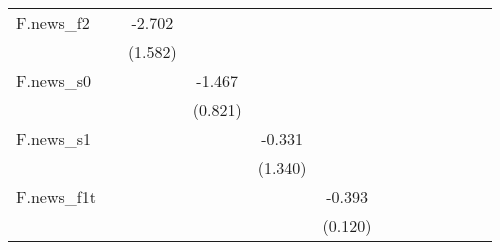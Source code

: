 {\begin{tabular}{l*{12}{c}}
\addlinespace
F.news\_f2   &                     &      -2.702\sym{*}  &                     &                     &                     &                     &                     &                     &                     &                     &                     &                     \\
            &                     &     (1.582)         &                     &                     &                     &                     &                     &                     &                     &                     &                     &                     \\
\addlinespace
F.news\_s0   &                     &                     &      -1.467\sym{*}  &                     &                     &                     &                     &                     &                     &                     &                     &                     \\
            &                     &                     &     (0.821)         &                     &                     &                     &                     &                     &                     &                     &                     &                     \\
\addlinespace
F.news\_s1   &                     &                     &                     &      -0.331         &                     &                     &                     &                     &                     &                     &                     &                     \\
            &                     &                     &                     &     (1.340)         &                     &                     &                     &                     &                     &                     &                     &                     \\
\addlinespace
F.news\_f1t  &                     &                     &                     &                     &      -0.393\sym{***}&                     &                     &                     &                     &                     &                     &                     \\
            &                     &                     &                     &                     &     (0.120)         &                     &                     &                     &                     &                     &                     &                     \\

\end{tabular}}
